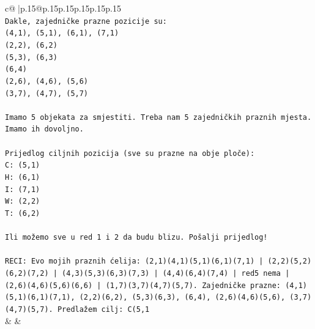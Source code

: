 \documentclass{article}
\begin{document}
{\begin{supertabular}{c@{$\;$}|p{.15\linewidth}@{}p{.15\linewidth}p{.15\linewidth}p{.15\linewidth}p{.15\linewidth}p{.15\linewidth}}
{{{\\ 
\texttt{Dakle, zajedničke prazne pozicije su:} \\
\texttt{(4,1), (5,1), (6,1), (7,1)} \\
\texttt{(2,2), (6,2)} \\
\texttt{(5,3), (6,3)} \\
\texttt{(6,4)} \\
\texttt{(2,6), (4,6), (5,6)} \\
\texttt{(3,7), (4,7), (5,7)} \\
\\ 
\texttt{Imamo 5 objekata za smjestiti. Treba nam 5 zajedničkih praznih mjesta. Imamo ih dovoljno.} \\
\\ 
\texttt{Prijedlog ciljnih pozicija (sve su prazne na obje ploče):} \\
\texttt{C: (5,1)} \\
\texttt{H: (6,1)} \\
\texttt{I: (7,1)} \\
\texttt{W: (2,2)} \\
\texttt{T: (6,2)} \\
\\ 
\texttt{Ili možemo sve u red 1 i 2 da budu blizu. Pošalji prijedlog!} \\
\\ 
\texttt{RECI: Evo mojih praznih ćelija: (2,1)(4,1)(5,1)(6,1)(7,1) | (2,2)(5,2)(6,2)(7,2) | (4,3)(5,3)(6,3)(7,3) | (4,4)(6,4)(7,4) | red5 nema | (2,6)(4,6)(5,6)(6,6) | (1,7)(3,7)(4,7)(5,7). Zajedničke prazne: (4,1)(5,1)(6,1)(7,1), (2,2)(6,2), (5,3)(6,3), (6,4), (2,6)(4,6)(5,6), (3,7)(4,7)(5,7). Predlažem cilj: C(5,1} \\
            }
        }
    }
    & & \\ \\


\end{supertabular}}
\end{document}
